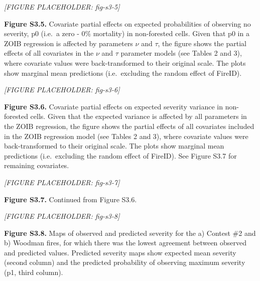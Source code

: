 \documentclass[
  numafflabel,
  authoryear,
  preprint]{elsarticle}
\begin{document}
\newpage{}

\emph{{[}FIGURE PLACEHOLDER: fig-s3-5{]}}

\textbf{Figure S3.5.} Covariate partial effects on expected
probabilities of observing no severity, p0 (i.e.~a zero - 0\% mortality)
in non-forested cells. Given that p0 in a ZOIB regression is affected by
parameters \(\nu\) and \(\tau\), the figure shows the partial effects of
all covariates in the \(\nu\) and \(\tau\) parameter models (see Tables
2 and 3), where covariate values were back-transformed to their original
scale. The plots show marginal mean predictions (i.e.~excluding the
random effect of FireID).

\newpage{}

\emph{{[}FIGURE PLACEHOLDER: fig-s3-6{]}}

\textbf{Figure S3.6.} Covariate partial effects on expected severity
variance in non-forested cells. Given that the expected variance is
affected by all parameters in the ZOIB regression, the figure shows the
partial effects of all covariates included in the ZOIB regression model
(see Tables 2 and 3), where covariate values were back-transformed to
their original scale. The plots show marginal mean predictions
(i.e.~excluding the random effect of FireID). See Figure S3.7 for
remaining covariates.

\newpage{}

\emph{{[}FIGURE PLACEHOLDER: fig-s3-7{]}}

\textbf{Figure S3.7.} Continued from Figure S3.6.

\newpage{}

\begin{landscape}

\emph{{[}FIGURE PLACEHOLDER: fig-s3-8{]}}

\textbf{Figure S3.8.} Maps of observed and predicted severity for the a)
Contest \#2 and b) Woodman fires, for which there was the lowest
agreement between observed and predicted values. Predicted severity maps
show expected mean severity (second column) and the predicted
probability of observing maximum severity (p1, third column).

\end{landscape}



\end{document}
